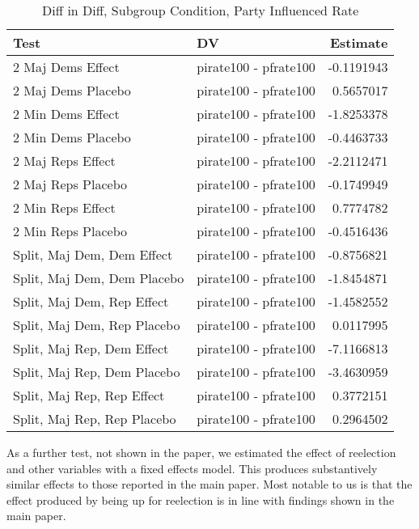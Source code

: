 \documentclass[12pt]{article}
\begin{document}
\begin{table}[H]
	\centering
	\caption{Diff in Diff, Subgroup Condition, Party Influenced Rate} 
	\begin{tabular}{llr}
		\hline
		Test & DV & Estimate \\ 
		\hline
		2 Maj Dems Effect & pirate100 - pfrate100 & -0.1191943 \\ 
		2 Maj Dems Placebo & pirate100 - pfrate100 & 0.5657017 \\ 
		2 Min Dems Effect & pirate100 - pfrate100 & -1.8253378 \\ 
		2 Min Dems Placebo & pirate100 - pfrate100 & -0.4463733 \\ 
		2 Maj Reps Effect & pirate100 - pfrate100 & -2.2112471 \\ 
		2 Maj Reps Placebo & pirate100 - pfrate100 & -0.1749949 \\ 
		2 Min Reps Effect & pirate100 - pfrate100 & 0.7774782 \\ 
		2 Min Reps Placebo & pirate100 - pfrate100 & -0.4516436 \\ 
		Split, Maj Dem, Dem Effect & pirate100 - pfrate100 & -0.8756821 \\ 
		Split, Maj Dem, Dem Placebo & pirate100 - pfrate100 & -1.8454871 \\ 
		Split, Maj Dem, Rep Effect & pirate100 - pfrate100 & -1.4582552 \\ 
		Split, Maj Dem, Rep Placebo & pirate100 - pfrate100 & 0.0117995 \\ 
		Split, Maj Rep, Dem Effect & pirate100 - pfrate100 & -7.1166813 \\ 
		Split, Maj Rep, Dem Placebo & pirate100 - pfrate100 & -3.4630959 \\ 
		Split, Maj Rep, Rep Effect & pirate100 - pfrate100 & 0.3772151 \\ 
		Split, Maj Rep, Rep Placebo & pirate100 - pfrate100 & 0.2964502 \\ 
		\hline
	\end{tabular}
\end{table}

As a further test, not shown in the paper, we estimated the effect of reelection and other variables with a fixed effects model. This produces substantively similar effects to those reported in the main paper. Most notable to us is that the effect produced by being up for reelection is in line with findings shown in the main paper.
\end{document}
